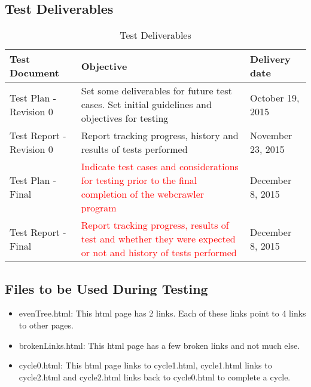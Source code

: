 \documentclass[12pt, titlepage]{article}
\begin{document}
\subsection{Test Deliverables}
\begin{table}[h!]
\begin{tabular}{| p{5cm} | p{5cm} | p{5cm} |}    \hline
Test Document&Objective&Delivery date\\ \hline
Test Plan - Revision 0&Set some deliverables for future test cases. Set initial guidelines and objectives for testing&October 19, 2015\\ \hline
Test Report -Revision 0&Report tracking progress, history and results of tests performed&November 23, 2015\\ \hline
Test Plan -Final&\textcolor{red}{Indicate test cases and considerations for testing prior to the final completion of the webcrawler program}&December 8, 2015\\ \hline
Test Report - Final&\textcolor{red}{Report tracking progress, results of test and whether they were expected or not and history of tests performed}&December 8, 2015\\ \hline
\end{tabular}
\caption{Test Deliverables}
\label{table:Test Deliverables}
\end{table}

\subsection{Files to be Used During Testing}
\begin{itemize}
\item evenTree.html: This html page has 2 links. Each of these links point to 4 links to other pages.
\item brokenLinks.html: This html page has a few broken links and not much else.
\item cycle0.html: This html page links to cycle1.html, cycle1.html links to cycle2.html and cycle2.html links back to cycle0.html to complete a cycle.
\end{itemize}
\end{document}
